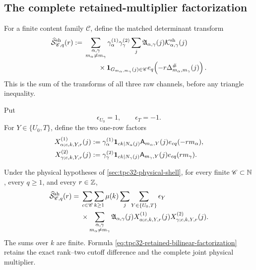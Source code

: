 \subsection{The complete retained-multiplier factorization}

For a finite content family \(\mathscr C\), define the matched
determinant transform
\begin{align}
 \widehat{\mathcal S}^{\mathrm{sh}}_{\mathscr C,q}(r)
 :={}&\sum_{\substack{\alpha,\gamma\\m_\alpha\ne m_\gamma}}
 \gamma_\alpha^{(1)}\gamma_\gamma^{(2)}
 \sum_j\mathfrak A_{\alpha,\gamma}(j)
 \mathcal K^{\mathrm{sh}}_{\alpha,\gamma}(j)
 \notag\\
 &\qquad\times
 \mathbf 1_{G_{m_\alpha,m_\gamma}(j)\in\mathscr C}
 e_q\!\left(-r\Delta^\#_{m_\alpha,m_\gamma}(j)\right).
 \label{eq:tpc32-matched-determinant-transform}
\end{align}
This is the sum of the transforms of all three raw channels, before
any triangle inequality.

Put
\begin{equation}
 \epsilon_{U_0}=1,\qquad \epsilon_T=-1.
 \label{eq:tpc32-cutoff-signs}
\end{equation}
For \(Y\in\{U_0,T\}\), define the two one-row factors
\begin{align}
 X^{(1)}_{\alpha;c,k,Y,r}(j)
 :={}&\gamma_\alpha^{(1)}
 \mathbf 1_{ck\mid N_\alpha(j)}
 \mathsf A_{m_\alpha,Y}(j)
 e_{cq}(-rm_\alpha),
 \label{eq:tpc32-left-row-factor}\\
 X^{(2)}_{\gamma;c,k,Y,r}(j)
 :={}&\gamma_\gamma^{(2)}
 \mathbf 1_{ck\mid N_\gamma(j)}
 \mathsf A_{m_\gamma,Y}(j)
 e_{cq}(rm_\gamma).
 \label{eq:tpc32-right-row-factor}
\end{align}

\begin{theorem}
\label{thm:tpc32-retained-bilinear-factorization}
Under the physical hypotheses of
\cref{sec:tpc32-physical-shell}, for every finite
\(\mathscr C\subset\mathbb N\), every \(q\ge1\), and every \(r\in\mathbb Z\),
\begin{align}
 \widehat{\mathcal S}^{\mathrm{sh}}_{\mathscr C,q}(r)
 ={}&\sum_{c\in\mathscr C}\sum_{k\ge1}\mu(k)
 \sum_j\sum_{Y\in\{U_0,T\}}\epsilon_Y
 \notag\\
 &\times\sum_{\substack{\alpha,\gamma\\m_\alpha\ne m_\gamma}}
 \mathfrak A_{\alpha,\gamma}(j)
 X^{(1)}_{\alpha;c,k,Y,r}(j)
 X^{(2)}_{\gamma;c,k,Y,r}(j).
 \label{eq:tpc32-retained-bilinear-factorization}
\end{align}
The sums over \(k\) are finite.  Formula
\eqref{eq:tpc32-retained-bilinear-factorization} retains the exact
rank--two cutoff difference and the complete joint physical
multiplier.
\end{theorem}

